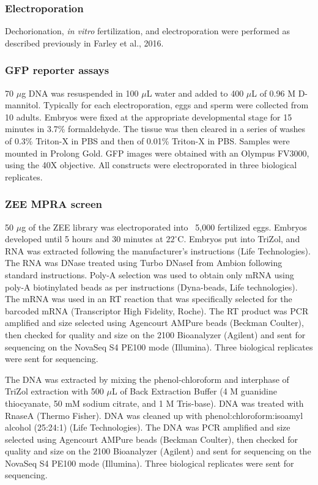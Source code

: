 \subsubsection{Electroporation}
Dechorionation, \textit{in vitro} fertilization, and electroporation were performed as described previously in Farley et al., 2016.

\subsubsection{GFP reporter assays}
70 $\mu$g DNA was resuspended in 100 $\mu$L water and added to 400 $\mu$L of 0.96 M D-mannitol. Typically for each electroporation, eggs and sperm were collected from 10 adults. Embryos were fixed at the appropriate developmental stage for 15 minutes in 3.7\% formaldehyde. The tissue was then cleared in a series of washes of 0.3\% Triton-X in PBS and then of 0.01\% Triton-X in PBS. Samples were mounted in Prolong Gold. GFP images were obtained with an Olympus FV3000, using the 40X objective. All constructs were electroporated in three biological replicates.

\subsubsection{ZEE MPRA screen}
50 $\mu$g of the ZEE library was electroporated into ~5,000 fertilized eggs. Embryos developed until 5 hours and 30 minutes at $22^\circ$C. Embryos put into TriZol, and RNA was extracted following the manufacturer's instructions (Life Technologies). The RNA was DNase treated using Turbo DNaseI from Ambion following standard instructions. Poly-A selection was used to obtain only mRNA using poly-A biotinylated beads as per instructions (Dyna-beads, Life technologies). The mRNA was used in an RT reaction that was specifically selected for the barcoded mRNA (Transcriptor High Fidelity, Roche). The RT product was PCR amplified and size selected using Agencourt AMPure beads (Beckman Coulter), then checked for quality and size on the 2100 Bioanalyzer (Agilent) and sent for sequencing on the NovaSeq S4 PE100 mode (Illumina). Three biological replicates were sent for sequencing. 

The DNA was extracted by mixing the phenol-chloroform and interphase of TriZol extraction with 500 $\mu$L of Back Extraction Buffer (4 M guanidine thiocyanate, 50 mM sodium citrate, and 1 M Tris-base). DNA was treated with RnaseA (Thermo Fisher). DNA was cleaned up with phenol:chloroform:isoamyl alcohol (25:24:1) (Life Technologies). The DNA was PCR amplified and size selected using Agencourt AMPure beads (Beckman Coulter), then checked for quality and size on the 2100 Bioanalyzer (Agilent) and sent for sequencing on the NovaSeq S4 PE100 mode (Illumina). Three biological replicates were sent for sequencing.

